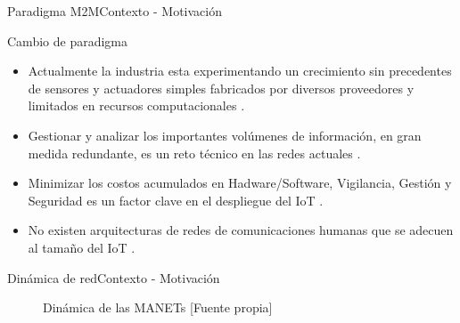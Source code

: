 \begin{frame}{Paradigma M2M}{Contexto - Motivación}
\begin{block}{Cambio de paradigma}
  \begin{itemize}
    \justifying
    \item<1-|alert@1> Actualmente la industria esta experimentando un crecimiento sin precedentes de sensores y actuadores simples fabricados por diversos proveedores y limitados en recursos computacionales \cite{M2MARCHITECTUREPERFORMANCE}. 
    \item<2-|alert@2> Gestionar y analizar los importantes volúmenes de información, en gran medida redundante, es un reto técnico en las redes actuales \cite{IOTIPV6MIPV6}.
    \item<3-|alert@3> Minimizar los costos acumulados en Hadware/Software, Vigilancia, Gestión y Seguridad es un factor clave en el despliegue del IoT \cite{RethinkIOT}.
    \item<4-|alert@4> No existen arquitecturas de redes de comunicaciones humanas que se adecuen al tamaño del IoT \cite{RethinkIOT}. 
  \end{itemize}
 \end{block}
\end{frame}
\begin{frame}{Dinámica de red}{Contexto - Motivación}
    \begin{figure}[htbp]
	    \centering
	    \caption{Dinámica de las MANETs [Fuente propia]}
	    \label{fig:DinMan}
    \end{figure}
\end{frame}
